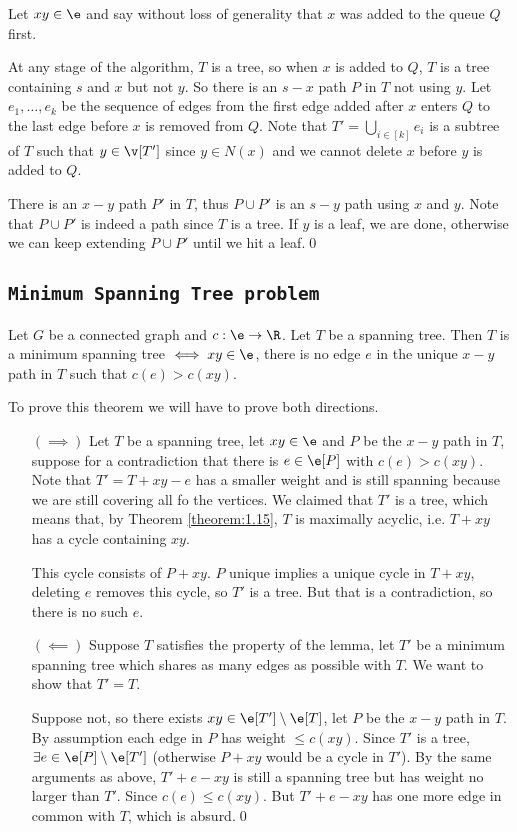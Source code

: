 \begin{prf}
    Let $xy \in \e$ and say without loss of generality that $x$ was added to the queue $Q$ first.

    At any stage of the algorithm, $T$ is a tree, so when $x$ is added to $Q$, $T$ is a tree containing $s$ and $x$ but not $y$. So there is an $s - x$ path $P$ in $T$ not using $y$. Let $e_1, \dots, e_k$ be the sequence of edges from the first edge added after $x$ enters $Q$ to the last edge before $x$ is removed from $Q$. Note that $T' = \bigcup_{i \in [k]}e_i$ is a subtree of $T$ such that $y \in \v[T']$ since $y \in N(x)$ and we cannot delete $x$ before $y$ is added to $Q$.

    There is an $x - y$ path $P'$ in $T$, thus $P \cup P'$ is an $s - y$ path using $x$ and $y$. Note that $P \cup P'$ is indeed a path since $T$ is a tree. If $y$ is a leaf, we are done, otherwise we can keep extending $P \cup P'$ until we hit a leaf.\qed
\end{prf}
\subsection{\texttt{Minimum Spanning Tree problem}}
\begin{customlemma}{1.22}
    \label{lemma:1.22}
    Let $G$ be a connected graph and $c: \e \rightarrow \R$. Let $T$ be a spanning tree. Then $T$ is a minimum spanning tree $\iff xy \in \e$, there is no edge $e$ in the unique $x - y$ path in $T$ such that $c(e) > c(xy)$. 
\end{customlemma}
\begin{prf}
    To prove this theorem we will have to prove both directions.
    \begin{itemize}
        \item[$(\implies)$] Let $T$ be a spanning tree, let $xy \in \e$ and $P$ be the $x - y$ path in $T$, suppose for a contradiction that there is $e \in \e[P]$ with $c(e) > c(xy)$. Note that $T' = T + xy - e$ has a smaller weight and is still spanning because we are still covering all fo the vertices. We claimed that $T'$ is a tree, which means that, by Theorem \ref{theorem:1.15}, $T$ is maximally acyclic, i.e. $T + xy$ has a cycle containing $xy$.

        This cycle consists of $P + xy$. $P$ unique implies a unique cycle in $T + xy$, deleting $e$ removes this cycle, so $T'$ is a tree. But that is a contradiction, so there is no such $e$.
        \item[$(\impliedby)$] Suppose $T$ satisfies the property of the lemma, let $T'$ be a minimum spanning tree which shares as many edges as possible with $T$. We want to show that $T' = T$.
        
        Suppose not, so there exists $xy \in \e[T']\setminus\e[T]$, let $P$ be the $x - y$ path in $T$. By assumption each edge in $P$ has weight $\leq c(xy)$. Since $T'$ is a tree, $\exists e \in \e[P] \setminus \e[T']$ (otherwise $P + xy$ would be a cycle in $T'$). By the same arguments as above, $T' + e - xy$ is still a spanning tree but has weight no larger than $T'$. Since $c(e) \leq c(xy)$. But $T' + e - xy$ has one more edge in common with $T$, which is absurd.\qed
    \end{itemize}
\end{prf}
